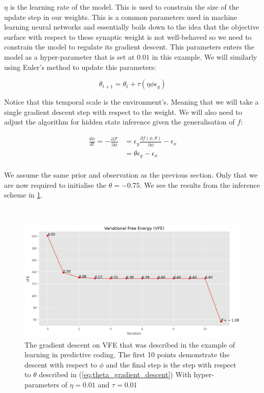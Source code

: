 \documentclass{article}
\newcommand{\refp}[1]{(\ref{#1})}
\begin{document}
$\eta$ is the learning rate of the model. This is used to constrain the size of the update step in our weights. This is a common parameters used in machine learning neural networks and essentially boils down to the idea that the objective surface with respect to these synaptic weight is not well-behaved so we need to constrain the model to regulate its gradient descent. This parameters enters the model as a hyper-parameter that is set at $0.01$ in this example. We will similarly using Euler's method to update this parameters:


\begin{equation*}
	\theta_{t + 1} = \theta_{t} + \tau ( \eta \phi \epsilon_y )
\end{equation*}

Notice that this temporal scale is the environment's. Meaning that we will take a single gradient descent step with respect to the weight. We will also need to adjust the algorithm for hidden state inference given the generalisation of $f$:

\begin{equation}\label{eq:pc_learning_phi}
	\begin{aligned}
		\frac{d \phi}{dt} = -\frac{\partial \mathcal{F}}{\partial \phi} &= \epsilon_y \frac{\partial f(\phi, \theta)}{\partial \phi} - \epsilon_x \\
		&= \theta \epsilon_y - \epsilon_x \\
    \end{aligned}
\end{equation}

We assume the same prior and observation as the previous section. Only that we are now required to initialise the $\theta = -0.75$. We see the results from the inference scheme in \ref{fig:pc_example_learning}. 

\

\begin{figure}[htbp]
	\centering
	\includegraphics[scale=0.5]{images/pc_example_learning.png}
	\caption{The gradient descent on VFE that was described in the example of learning in predictive coding. The first 10 points demonstrate the descent with respect to $\phi$ and the final step is the step with respect to $\theta$ described in \refp{eq:theta_gradient_descent} With hyper-parameters of $\eta = 0.01$ and $\tau = 0.01$} 
	\label{fig:pc_example_learning}
\end{figure}
\end{document}

